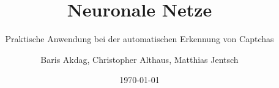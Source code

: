 \documentclass[a4paper,11pt]{report}
\title{Neuronale Netze}
\subtitle{Praktische Anwendung bei der automatischen Erkennung von Captchas}
\author{Baris Akdag, Christopher Althaus, Matthias Jentsch}
\date{\today}
\begin{document}
\maketitle
\tableofcontents



\nocite{*}

\end{document}
